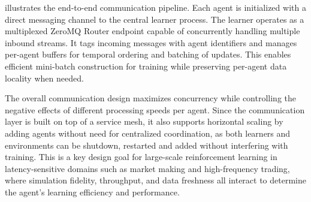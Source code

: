 \documentclass[11pt]{article}
\begin{document}
     illustrates the end-to-end communication pipeline.
    Each agent is initialized with a direct messaging channel to the central learner process.
    The learner operates as a multiplexed ZeroMQ Router endpoint capable of concurrently handling multiple inbound streams.
    It tags incoming messages with agent identifiers and manages per-agent buffers for temporal ordering and batching of updates.
    This enables efficient mini-batch construction for training while preserving per-agent data locality when needed.

    The overall communication design maximizes concurrency while controlling the negative effects of different processing speeds per agent.
    Since the communication layer is built on top of a service mesh,
    it also supports horizontal scaling by adding agents without need for centralized coordination,
    as both learners and environments can be shutdown, restarted and added without interfering with training.
    This is a key design goal for large-scale reinforcement learning in latency-sensitive domains such as market making and high-frequency trading,
    where simulation fidelity, throughput, and data freshness all interact to determine the agent’s learning efficiency and performance.
\end{document}
